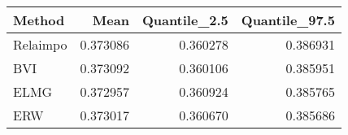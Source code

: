 \begin{table}[ht]
\centering
\begin{tabular}{lrrr}
  \hline
Method & Mean & Quantile\_2.5 & Quantile\_97.5 \\ 
  \hline
Relaimpo & 0.373086 & 0.360278 & 0.386931 \\ 
  BVI & 0.373092 & 0.360106 & 0.385951 \\ 
  ELMG & 0.372957 & 0.360924 & 0.385765 \\ 
  ERW & 0.373017 & 0.360670 & 0.385686 \\ 
   \hline
\end{tabular}
\end{table}
